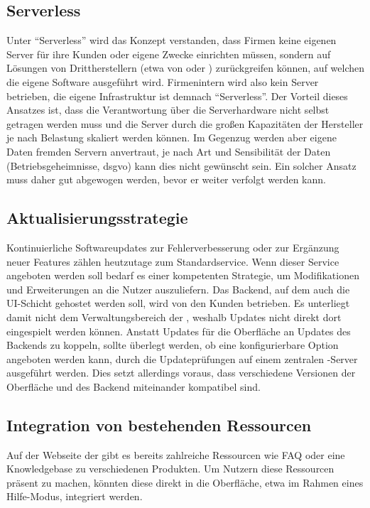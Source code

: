 \subsection{Serverless}
Unter ``Serverless'' wird das Konzept verstanden, dass Firmen keine eigenen Server für ihre Kunden oder eigene Zwecke einrichten müssen, sondern auf Lösungen von Drittherstellern (etwa  von  oder ) zurückgreifen können, auf welchen die eigene Software ausgeführt wird. Firmenintern wird also kein Server betrieben, die eigene Infrastruktur ist demnach ``Serverless''. Der Vorteil dieses Ansatzes ist, dass die Verantwortung über die Serverhardware nicht selbst getragen werden muss und die Server durch die großen Kapazitäten der Hersteller je nach Belastung skaliert werden können. Im Gegenzug werden aber eigene Daten fremden Servern anvertraut, je nach Art und Sensibilität der Daten (Betriebsgeheimnisse, \gls{dsgvo}) kann dies nicht gewünscht sein. Ein solcher Ansatz muss daher gut abgewogen werden, bevor er weiter verfolgt werden kann.

\subsection{Aktualisierungsstrategie}
Kontinuierliche Softwareupdates zur Fehlerverbesserung oder zur Ergänzung neuer Features zählen heutzutage zum Standardservice. Wenn dieser Service angeboten werden soll bedarf es einer kompetenten Strategie, um Modifikationen und Erweiterungen an die Nutzer auszuliefern. Das Backend, auf dem auch die UI-Schicht gehostet werden soll, wird von den Kunden betrieben. Es unterliegt damit nicht dem Verwaltungsbereich der , weshalb Updates nicht direkt dort eingespielt werden können. Anstatt Updates für die Oberfläche an Updates des Backends zu koppeln, sollte überlegt werden, ob eine konfigurierbare Option angeboten werden kann, durch die Updateprüfungen auf einem zentralen -Server ausgeführt werden. Dies setzt allerdings voraus, dass verschiedene Versionen der Oberfläche und des Backend miteinander kompatibel sind. 

\subsection{Integration von bestehenden Ressourcen}
Auf der Webseite der  gibt es bereits zahlreiche Ressourcen wie FAQ oder eine Knowledgebase zu verschiedenen Produkten. Um Nutzern diese Ressourcen präsent zu machen, könnten diese direkt in die Oberfläche, etwa im Rahmen eines Hilfe-Modus, integriert werden.


